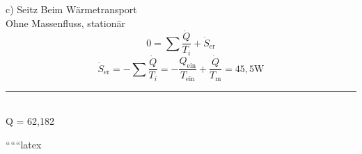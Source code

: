c) Seitz \rightarrow Beim Wärmetransport \\
\hspace{1cm} Ohne Massenfluss, stationär \\
\[
0 = \sum \frac{\dot{Q}}{T_i} + \dot{S}_{\text{er}}
\]
\[
\dot{S}_{\text{er}} = -\sum \frac{\dot{Q}}{T_i} = -\frac{Q_{\text{ein}}}{T_{\text{ein}}} + \frac{\dot{Q}}{T_{\text{m}}} = 45,5 \text{W}
\]

\hspace{1cm} \rule{5cm}{0.5pt} \\
Q = 62,182 

``````latex